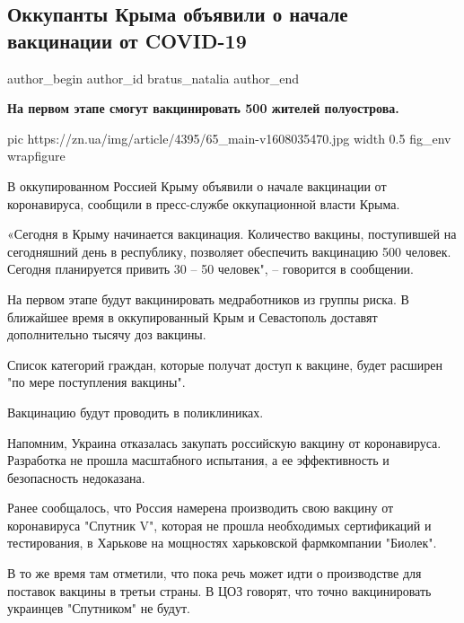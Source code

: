  
 
 
 
 
 
\subsection{Оккупанты Крыма объявили о начале вакцинации от COVID-19}
\label{sec:15_12_2020.news.ua.zn.bratus_natalia.1.vaccination_krym}
\ifcmt
	author_begin
   author_id bratus_natalia
	author_end
\fi
{}

\textbf{На первом этапе смогут вакцинировать 500 жителей полуострова.} 

\ifcmt
  pic https://zn.ua/img/article/4395/65_main-v1608035470.jpg
  width 0.5
  fig_env wrapfigure
\fi

В оккупированном Россией Крыму объявили о начале вакцинации от коронавируса,
сообщили в пресс-службе оккупационной власти Крыма.

«Сегодня в Крыму начинается вакцинация. Количество вакцины, поступившей на
сегодняшний день в республику, позволяет обеспечить вакцинацию 500 человек.
Сегодня планируется привить 30 – 50 человек", – говорится в сообщении.

На первом этапе будут вакцинировать медработников из группы риска. В ближайшее
время в оккупированный Крым и Севастополь доставят дополнительно тысячу доз
вакцины.

Список категорий граждан, которые получат доступ к вакцине, будет расширен "по
мере поступления вакцины".

Вакцинацию будут проводить в поликлиниках.

Напомним, Украина отказалась закупать российскую вакцину от коронавируса.
Разработка не прошла масштабного испытания, а ее эффективность и безопасность
недоказана.

Ранее сообщалось, что Россия намерена производить свою вакцину от коронавируса
"Спутник
V",
которая не прошла необходимых сертификаций и тестирования, в Харькове на
мощностях харьковской фармкомпании "Биолек".

В то же время там отметили, что пока речь может идти о производстве для
поставок вакцины в третьи страны. В ЦОЗ говорят, что точно вакцинировать
украинцев "Спутником" не будут.
